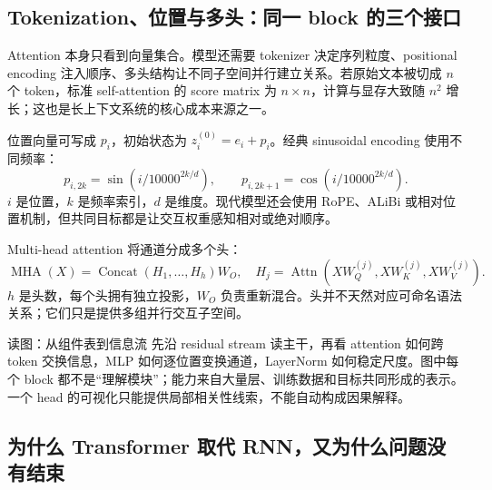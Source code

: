 \subsection{Tokenization、位置与多头：同一 block 的三个接口}

Attention 本身只看到向量集合。模型还需要 tokenizer 决定序列粒度、positional encoding 注入顺序、多头结构让不同子空间并行建立关系。若原始文本被切成 $n$ 个 token，标准 self-attention 的 score matrix 为 $n\times n$，计算与显存大致随 $n^2$ 增长；这也是长上下文系统的核心成本来源之一。



位置向量可写成 $p_i$，初始状态为 $z_i^{(0)}=e_i+p_i$。经典 sinusoidal encoding 使用不同频率：
\[
p_{i,2k}=\sin\!\left(i/10000^{2k/d}\right),\qquad
p_{i,2k+1}=\cos\!\left(i/10000^{2k/d}\right).
\]
$i$ 是位置，$k$ 是频率索引，$d$ 是维度。现代模型还会使用 RoPE、ALiBi 或相对位置机制，但共同目标都是让交互权重感知相对或绝对顺序。

Multi-head attention 将通道分成多个头：
\[
\operatorname{MHA}(X)=\operatorname{Concat}(H_1,\ldots,H_h)W_O,
\quad H_j=\operatorname{Attn}(XW_Q^{(j)},XW_K^{(j)},XW_V^{(j)}).
\]
$h$ 是头数，每个头拥有独立投影，$W_O$ 负责重新混合。头并不天然对应可命名语法关系；它们只是提供多组并行交互子空间。



\begin{knowledgebox}{读图：从组件表到信息流}
先沿 residual stream 读主干，再看 attention 如何跨 token 交换信息，MLP 如何逐位置变换通道，LayerNorm 如何稳定尺度。图中每个 block 都不是“理解模块”；能力来自大量层、训练数据和目标共同形成的表示。一个 head 的可视化只能提供局部相关性线索，不能自动构成因果解释。
\end{knowledgebox}

\subsection{为什么 Transformer 取代 RNN，又为什么问题没有结束}

